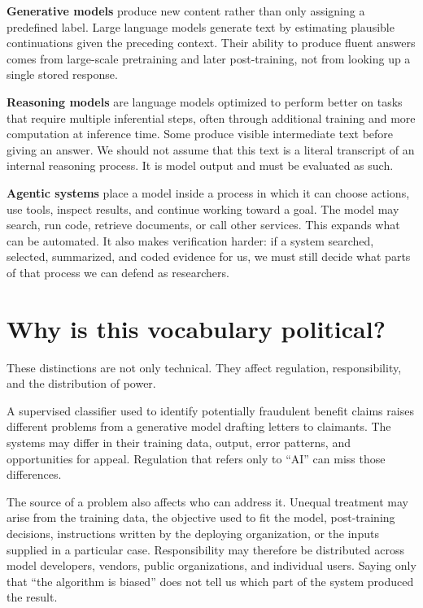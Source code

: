 \documentclass[
  a4paper,
]{scrbook}
\begin{document}
\textbf{Generative models} produce new content rather than only
assigning a predefined label. Large language models generate text by
estimating plausible continuations given the preceding context. Their
ability to produce fluent answers comes from large-scale pretraining and
later post-training, not from looking up a single stored response.

\textbf{Reasoning models} are language models optimized to perform
better on tasks that require multiple inferential steps, often through
additional training and more computation at inference time. Some produce
visible intermediate text before giving an answer. We should not assume
that this text is a literal transcript of an internal reasoning process.
It is model output and must be evaluated as such.

\textbf{Agentic systems} place a model inside a process in which it can
choose actions, use tools, inspect results, and continue working toward
a goal. The model may search, run code, retrieve documents, or call
other services. This expands what can be automated. It also makes
verification harder: if a system searched, selected, summarized, and
coded evidence for us, we must still decide what parts of that process
we can defend as researchers.

\section{Why is this vocabulary
political?}\label{why-is-this-vocabulary-political}

These distinctions are not only technical. They affect regulation,
responsibility, and the distribution of power.

A supervised classifier used to identify potentially fraudulent benefit
claims raises different problems from a generative model drafting
letters to claimants. The systems may differ in their training data,
output, error patterns, and opportunities for appeal. Regulation that
refers only to ``AI'' can miss those differences.

The source of a problem also affects who can address it. Unequal
treatment may arise from the training data, the objective used to fit
the model, post-training decisions, instructions written by the
deploying organization, or the inputs supplied in a particular case.
Responsibility may therefore be distributed across model developers,
vendors, public organizations, and individual users. Saying only that
``the algorithm is biased'' does not tell us which part of the system
produced the result.
\end{document}
